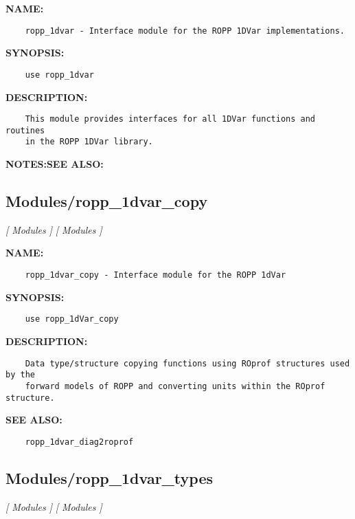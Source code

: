 \label{ch:robo36}
\label{ch:Modules_ropp_1dvar}
\textbf{NAME:}\hspace{0.08in}\begin{Verbatim}
    ropp_1dvar - Interface module for the ROPP 1DVar implementations.
\end{Verbatim}
\textbf{SYNOPSIS:}\hspace{0.08in}\begin{Verbatim}
    use ropp_1dvar
\end{Verbatim}
\textbf{DESCRIPTION:}\hspace{0.08in}\begin{Verbatim}
    This module provides interfaces for all 1DVar functions and routines
    in the ROPP 1DVar library.
\end{Verbatim}
\textbf{NOTES:}\hspace{0.08in}\textbf{SEE ALSO:}\hspace{0.08in}\subsection{Modules/ropp\_1dvar\_copy}
\textsl{[ Modules ]}
\textsl{[ Modules ]}

\label{ch:robo37}
\label{ch:Modules_ropp_1dvar_copy}
\textbf{NAME:}\hspace{0.08in}\begin{Verbatim}
    ropp_1dvar_copy - Interface module for the ROPP 1dVar
\end{Verbatim}
\textbf{SYNOPSIS:}\hspace{0.08in}\begin{Verbatim}
    use ropp_1dVar_copy
\end{Verbatim}
\textbf{DESCRIPTION:}\hspace{0.08in}\begin{Verbatim}
    Data type/structure copying functions using ROprof structures used by the
    forward models of ROPP and converting units within the ROprof structure.
\end{Verbatim}
\textbf{SEE ALSO:}\hspace{0.08in}\begin{Verbatim}
    ropp_1dvar_diag2roprof
\end{Verbatim}
\subsection{Modules/ropp\_1dvar\_types}
\textsl{[ Modules ]}
\textsl{[ Modules ]}

